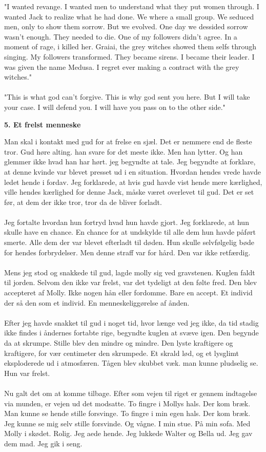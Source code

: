\documentclass[]{article}
\begin{document}
"I wanted revange. I wanted men to understand what they put women through. I wanted Jack to realize what he had done. We where a small group. We seduced men, only to show them sorrow. But we evolved. One day we dessided sorrow wasn't enough. They needed to die. One of my followers didn't agree. In a moment of rage, i killed her. Graiai, the grey witches showed them selfs through singing. My followers transformed. They became sirens. I became their leader. I was given the name Medusa. I regret ever making a contract with the grey witches."
\\ \\
"This is what god can't forgive. This is why god sent you here. But I will take your case. I will defend you. I will have you pass on to the other side."

\begin{center}
	\large\textbf{5. Et frelst menneske}
\end{center}

Man skal i kontakt med gud for at frelse en sjæl. Det er nemmere end de fleste tror. Gud høre alting. han svare for det meste ikke. Men han lytter. Og han glemmer ikke hvad han har hørt. jeg begyndte at tale. Jeg begyndte at forklare, at denne kvinde var blevet presset ud i en situation. Hvordan hendes vrede havde ledet hende i fordav. Jeg forklarede, at hvis gud havde vist hende mere kærlighed, ville hendes kærlighed for denne Jack, måske været overlevet til gud. Det er set før, at dem der ikke tror, tror da de bliver forladt.
\\ \\
Jeg fortalte hvordan hun fortryd hvad hun havde gjort. Jeg forklarede, at hun skulle have en chance. En chance for at undskylde til alle dem hun havde påført smerte. Alle dem der var blevet efterladt til døden. Hun skulle selvfølgelig bøde for hendes forbrydelser. Men denne straff var for hård. Den var ikke retfærdig. 
\\ \\
Mens jeg stod og snakkede til gud, lagde molly sig ved gravstenen. Kuglen faldt til jorden. Selvom den ikke var frelst, var det tydeligt at den følte fred. Den blev accepteret af Molly. Ikke nogen hån eller fordomme. Bare en accept. Et individ der så den som et individ. En menneskeliggørelse af ånden.
\\ \\
Efter jeg havde snakket til gud i noget tid, hvor længe ved jeg ikke, da tid stadig ikke findes i åndernes fortabte rige, begyndte kuglen at svæve igen. Den begynde da at skrumpe. Stille blev den mindre og mindre. Den lyste kraftigere og kraftigere, for vær centimeter den skrumpede. Et skrald lød, og et lysglimt eksploderede ud i atmosfæren. Tågen blev skubbet væk. man kunne pludselig se. Hun var frelst.
\\ \\
Nu galt det om at komme tilbage. Efter som vejen til riget er gennem indtagelse via munden, er vejen ud det modsatte. To fingre i Mollys hals. Der kom bræk. Man kunne se hende stille forsvinge. To fingre i min egen hals. Der kom bræk. Jeg kunne se mig selv stille forsvinde. Og vågne. I min stue. På min sofa. Med Molly i skødet. Rolig. Jeg aede hende. Jeg lukkede Walter og Bella ud. Jeg gav dem mad. Jeg gik i seng.
\end{document}
